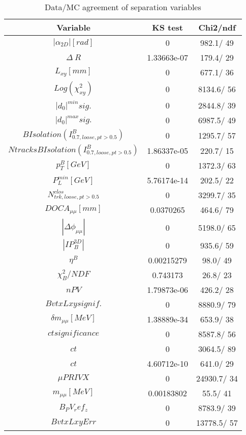 \documentclass{article}
\begin{document}
\begin{table}[htbp]
\caption{\label{tab:sepVars}Data/MC agreement of separation variables}
\begin{center}
\begin{tabular}{c|c|c}
Variable & KS test & Chi2/ndf \\
\hline
$|\alpha_{2D}| [rad]$ & 0 & 982.1/ 49\\
\hline
$\Delta~R$ & 1.33663e-07 & 179.4/ 29\\
\hline
$L_{xy} [mm]$ & 0 & 677.1/ 36\\
\hline
$Log(\chi^{2}_{xy})$ & 0 & 8134.6/ 56\\
\hline
$|d_{0}|^{min} sig.$ & 0 & 2844.8/ 39\\
\hline
$|d_{0}|^{max} sig.$ & 0 & 6987.5/ 49\\
\hline
$B Isolation (I^{B}_{0.7, loose, pt>0.5})$ & 0 & 1295.7/ 57\\
\hline
$Ntracks B Isolation (I^{B}_{0.7, loose, pt>0.5})$ & 1.86337e-05 & 220.7/ 15\\
\hline
$p_{T}^{B} [GeV]$ & 0 & 1372.3/ 63\\
\hline
$P^{min}_{L} [GeV]$ & 5.76174e-14 & 202.5/ 22\\
\hline
$N^{clos}_{trk, loose, pt>0.5}$ & 0 & 3299.7/ 35\\
\hline
$DOCA_{\mu\mu} [mm]$ & 0.0370265 & 464.6/ 79\\
\hline
$|\Delta\phi_{\mu\mu}|$ & 0 & 5198.0/ 65\\
\hline
$|IP_{B}^{3D}|$ & 0 & 935.6/ 59\\
\hline
$\eta^{B}$ & 0.00215279 &  98.0/ 49\\
\hline
$\chi^{2}_{B}/NDF$ & 0.743173 &  26.8/ 23\\
\hline
$nPV$ & 1.79873e-06 & 426.2/ 28\\
\hline
$BvtxLxy signif.$ & 0 & 8880.9/ 79\\
\hline
$\delta m_{\mu\mu} [MeV]$ & 1.38889e-34 & 653.9/ 38\\
\hline
$ct significance$ & 0 & 8587.8/ 56\\
\hline
$ct$ & 0 & 3064.5/ 89\\
\hline
$ct$ & 4.60712e-10 & 641.0/ 29\\
\hline
$\mu PRIVX$ & 0 & 24930.7/ 34\\
\hline
$m_{\mu\mu} [MeV]$ & 0.00183802 &  55.5/ 41\\
\hline
$B_PV_ref_z$ & 0 & 8783.9/ 39\\
\hline
$BvtxLxyErr$ & 0 & 13778.5/ 57\\

\end{tabular}
\end{center}
\end{table}
\end{document}
